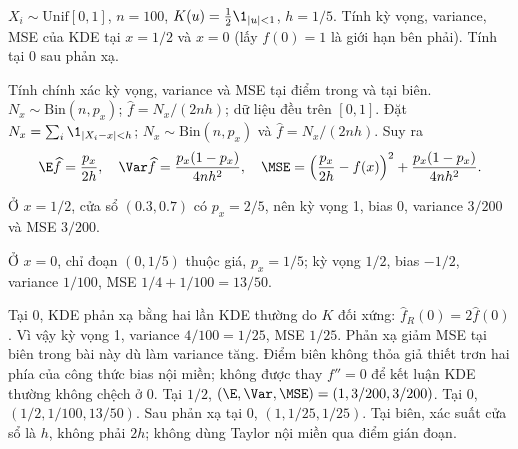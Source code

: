 \begin{problem}\label{k:44}
$X_i\sim\mathrm{Unif}[0,1]$, $n=100$, $K(u)=\frac12\1_{|u|<1}$, $h=1/5$. Tính kỳ vọng, variance, MSE của KDE tại $x=1/2$ và $x=0$ (lấy $f(0)=1$ là giới hạn bên phải). Tính tại 0 sau phản xạ.
\end{problem}
\begin{solution}
Tính chính xác kỳ vọng, variance và MSE tại điểm trong và tại biên.
$N_x\sim\mathrm{Bin}(n,p_x)$; $\widehat f=N_x/(2nh)$; dữ liệu đều trên $[0,1]$.
Đặt $N_x=\sum_i\1_{|X_i-x|<h}$; $N_x\sim\mathrm{Bin}(n,p_x)$ và $\widehat f=N_x/(2nh)$. Suy ra
\[
 \E\widehat f=\frac{p_x}{2h},\quad
 \Var\widehat f=\frac{p_x(1-p_x)}{4nh^2},\quad
 \MSE=\left(\frac{p_x}{2h}-f(x)\right)^2+\frac{p_x(1-p_x)}{4nh^2}.
\]

Ở $x=1/2$, cửa sổ $(0.3,0.7)$ có $p_x=2/5$, nên kỳ vọng 1, bias 0, variance $3/200$ và MSE $3/200$.

Ở $x=0$, chỉ đoạn $(0,1/5)$ thuộc giá, $p_x=1/5$; kỳ vọng $1/2$, bias $-1/2$, variance $1/100$, MSE $1/4+1/100=13/50$.

Tại 0, KDE phản xạ bằng hai lần KDE thường do $K$ đối xứng:
$\widehat f_R(0)=2\widehat f(0)$. Vì vậy kỳ vọng 1, variance $4/100=1/25$, MSE $1/25$.
Phản xạ giảm MSE tại biên trong bài này dù làm variance tăng.
Điểm biên không thỏa giả thiết trơn hai phía của công thức bias nội miền; không được thay $f''=0$ để kết luận KDE thường không chệch ở 0.
Tại $1/2$, $(\E,\Var,\MSE)=(1,3/200,3/200)$. Tại 0, $(1/2,1/100,13/50)$. Sau phản xạ tại 0, $(1,1/25,1/25)$.
Tại biên, xác suất cửa sổ là $h$, không phải $2h$; không dùng Taylor nội miền qua điểm gián đoạn.
\end{solution}

